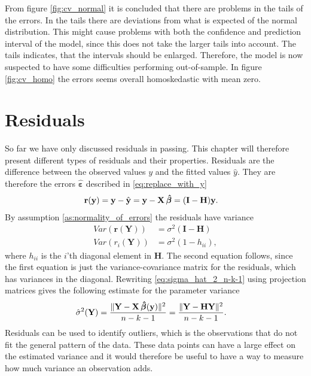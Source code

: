 From figure \ref{fig:cv_normal} it is concluded that there are problems in the tails of the errors. 
In the tails there are deviations from what is expected of the normal distribution. 
This might cause problems with both the confidence and prediction interval of the model, since this does not take the larger tails into account.
The tails indicates, that the intervals should be enlarged.
Therefore, the model is now suspected to have some difficulties performing out-of-sample. 
In figure \ref{fig:cv_homo} the errors seems overall homoskedastic with mean zero. 

\section{Residuals}\label{subsec:residuals}
So far we have only discussed residuals in passing. 
This chapter will therefore present different types of residuals and their properties.
Residuals are the difference between the observed values $y$ and the fitted values $\hat{y}$. They are therefore the errors $\boldsymbol{\hat{\varepsilon}}$ described in \eqref{eq:replace_with_y}
\begin{align*}
    \textbf{r}(\textbf{y}) &= \textbf{y} - \hat{\textbf{y}} = \textbf{y} - \textbf{X} \operatorname{\boldsymbol{\hat{\beta}}} = (\textbf{I} - \textbf{H}) \textbf{y}.
\end{align*}
By assumption \ref{as:normality_of_errors} the residuals have variance
\begin{align*}
    Var(\textbf{r}(\textbf{Y})) &= \sigma^2 (\textbf{I} - \textbf{H}) \\
    Var(r_i(\textbf{Y})) &= \sigma^2(1 - h_{ii}),
\end{align*}
where $h_{ii}$ is the $i$'th diagonal element in $\textbf{H}$. The second equation follows, since the first equation is just the variance-covariance matrix for the residuals, which has variances in the diagonal.
Rewriting \eqref{eq:sigma_hat_2_n-k-1} using projection matrices gives the following estimate for the parameter variance
\begin{align*}
    \hat{\sigma}^2(\textbf{Y}) &= \frac{\| \textbf{Y} - \textbf{X} \operatorname{\boldsymbol{\hat{\beta}}} (\textbf{y}) \|^2 }{n-k-1} = \frac{\| \textbf{Y} - \textbf{H} \textbf{Y} \|^2}{n-k-1} .
\end{align*}
Residuals can be used to identify outliers, which is the observations that do not fit the general pattern of the data.
These data points can have a large effect on the estimated variance and it would therefore be useful to have a way to measure how much variance an observation adds.
